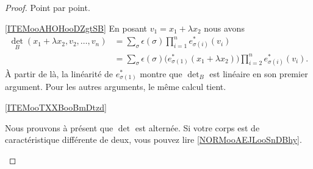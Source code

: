 \begin{proof}
    Point par point.
    \begin{subproof}
    \item[\ref{ITEMooAHOHooDZgtSB}]
            En posant \( v_1=x_1+\lambda x_2\) nous avons
            \begin{subequations}
                \begin{align}
                    \det_B(x_1+\lambda x_2,v_2,\ldots, v_n)&=\sum_{\sigma}\epsilon(\sigma)\prod_{i=1}^ne^*_{\sigma(i)}(v_i)\\
                    &=\sum_{\sigma}\epsilon(\sigma)\Big( e^*_{\sigma(1)}(x_1+\lambda x_2) \Big)\prod_{i=2}^ne^*_{\sigma(i)}(v_i).
                \end{align}
            \end{subequations}
            À partir de là, la linéarité de \( e^*_{\sigma(1)}\) montre que \( \det_B\) est linéaire en son premier argument. Pour les autres arguments, le même calcul tient.

        \item[\ref{ITEMooTXXBooBmDtzd}]

            Nous prouvons à présent que \( \det\) est alternée. Si votre corps est de caractéristique différente de deux, vous pouvez lire \ref{NORMooAEJLooSnDBhy}.


\end{subproof}
\end{proof}
